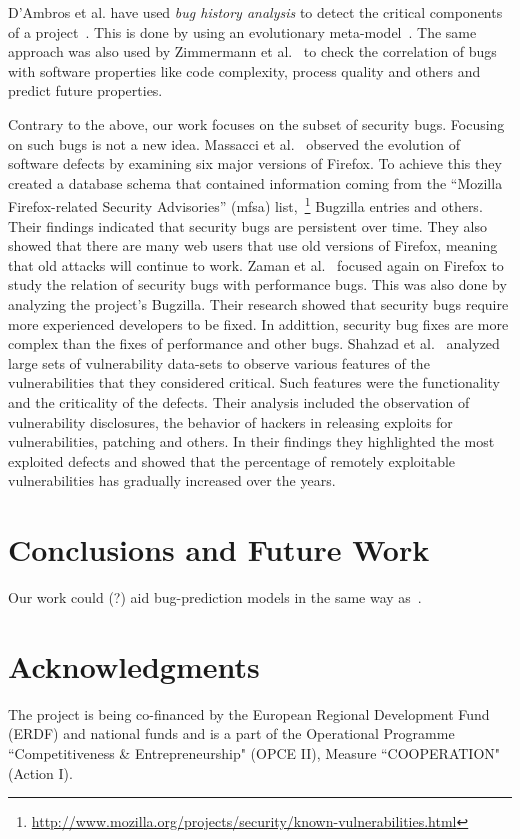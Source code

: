 \documentclass[conference]{IEEEtran}
\begin{document}
D'Ambros et al. have used {\it bug history analysis} to detect
the critical components of a project~\cite{D08}. This is done by using an
evolutionary meta-model~\cite{DL08}. The same approach was
also used by Zimmermann et al.~\cite{ZNA08} to check the correlation
of bugs with software properties like code complexity, process quality and others
and predict future properties.

Contrary to the above, our work focuses on the subset of security bugs.
Focusing on such bugs is not a new idea. Massacci et al.~\cite{MNN11} observed
the evolution of software defects by examining six major versions of Firefox.
To achieve this they created a database schema that contained information
coming from the ``Mozilla Firefox-related Security Advisories'' ({\sc mfsa})
list,~\footnote{\url{http://www.mozilla.org/projects/security/known-vulnerabilities.html}}
Bugzilla entries and others. Their findings indicated that security bugs are
persistent over time. They also showed that there are many web users that use
old versions of Firefox, meaning that old attacks will continue to work.
Zaman et al.~\cite{ZAH11} focused again on Firefox to study the relation of
security bugs with performance bugs. This was also done by analyzing the project's
Bugzilla. Their research showed that security bugs require more experienced developers
to be fixed. In addittion, security bug fixes are more complex than the
fixes of performance and other bugs.
Shahzad et al.~\cite{SSL12} analyzed large sets of vulnerability data-sets to observe
various features of the vulnerabilities that they considered critical. Such features
were the functionality and the criticality of the defects. Their analysis
included the observation of vulnerability disclosures, the behavior of
hackers in releasing exploits for vulnerabilities, patching and others. In
their findings they highlighted the most exploited defects and showed that
the percentage of remotely exploitable vulnerabilities has gradually increased
over the years.

\section{Conclusions and Future Work}
\label{sec:con}

Our work could (?) aid bug-prediction models in the same way as~\cite{BN11}.

\section*{Acknowledgments}

The project is being co-financed by the European Regional Development Fund (ERDF)
and national funds and is a part of the Operational Programme ``Competitiveness \&
Entrepreneurship" (OPCE II), Measure ``COOPERATION" (Action I).


 
\end{document}
